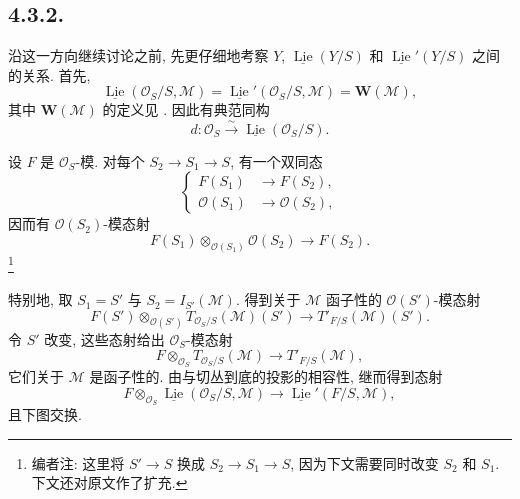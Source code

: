 \subsection*{4.3.2.}
沿这一方向继续讨论之前, 先更仔细地考察 \(Y\),
\(\underline{\operatorname{Lie}}(Y/S)\) 和
\(\underline{\operatorname{Lie}}'(Y/S)\) 之间的关系. 首先,
\begin{equation}
 \underline{\operatorname{Lie}}(\mathcal O_S/S,\mathcal M)
 =\underline{\operatorname{Lie}}'(\mathcal O_S/S,\mathcal M)
 =\mathbf W(\mathcal M),
 \tag{1}\label{sga3:ii:subsection:4-3-2:equation:1}
\end{equation}
其中 \(\mathbf W(\mathcal M)\) 的定义见 .
因此有典范同构
\begin{equation}
 d:\mathcal O_S\xrightarrow{\sim}
 \underline{\operatorname{Lie}}(\mathcal O_S/S).
 \tag{2}\label{sga3:ii:subsection:4-3-2:equation:2}
\end{equation}

设 \(F\) 是 \(\mathcal O_S\)-模. 对每个 \(S_2\to S_1\to S\), 有一个双同态
\begin{equation}
 \left\{
 \begin{aligned}
   F(S_1)&\longrightarrow F(S_2),\\
   \mathcal O(S_1)&\longrightarrow\mathcal O(S_2),
 \end{aligned}
 \right.
 \tag{3}\label{sga3:ii:subsection:4-3-2:equation:3}
\end{equation}
因而有 \(\mathcal O(S_2)\)-模态射
\[
 F(S_1)\otimes_{\mathcal O(S_1)}\mathcal O(S_2)
 \longrightarrow F(S_2).
\]
\footnote{编者注: 这里将 \(S'\to S\) 换成 \(S_2\to S_1\to S\),
因为下文需要同时改变 \(S_2\) 和 \(S_1\). 下文还对原文作了扩充.}

特别地, 取 \(S_1=S'\) 与 \(S_2=I_{S'}(\mathcal M)\).
得到关于 \(\mathcal M\) 函子性的 \(\mathcal O(S')\)-模态射
\[
 F(S')\otimes_{\mathcal O(S')}
 T_{\mathcal O_S/S}(\mathcal M)(S')
 \longrightarrow T'_{F/S}(\mathcal M)(S').
\]
令 \(S'\) 改变, 这些态射给出 \(\mathcal O_S\)-模态射
\begin{equation}
 F\otimes_{\mathcal O_S}T_{\mathcal O_S/S}(\mathcal M)
 \longrightarrow T'_{F/S}(\mathcal M),
 \tag{4}\label{sga3:ii:subsection:4-3-2:equation:4}
\end{equation}
它们关于 \(\mathcal M\) 是函子性的. 由与切丛到底的投影的相容性, 继而得到态射
\begin{equation}
 F\otimes_{\mathcal O_S}
 \underline{\operatorname{Lie}}(\mathcal O_S/S,\mathcal M)
 \longrightarrow
 \underline{\operatorname{Lie}}'(F/S,\mathcal M),
 \tag{5}\label{sga3:ii:subsection:4-3-2:equation:5}
\end{equation}
且下图交换.

